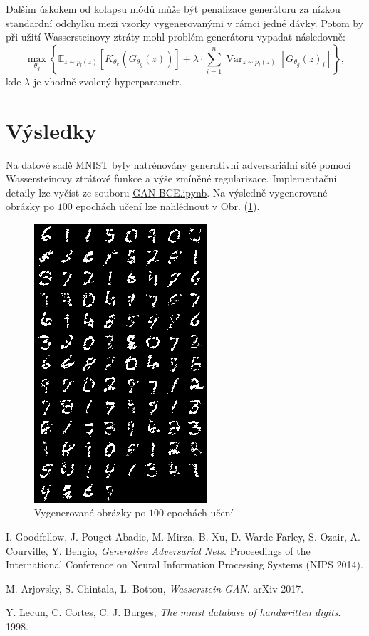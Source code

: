 \documentclass[czech]{article}
\begin{document}
Dalším úskokem od kolapsu módů může být penalizace generátoru za nízkou standardní odchylku mezi vzorky vygenerovanými v rámci jedné dávky.
Potom by při užití Wassersteinovy ztráty mohl problém generátoru vypadat následovně:
\begin{equation}
    \max_{\theta_g} \left\{ \mathbb{E}_{z \sim p_l(z)} \left[K_{\theta_k}\left(G_{\theta_g}(z)\right)\right]
     + \lambda \cdot \sum_{i = 1}^{n} \operatorname{Var}_{z \sim p_l(z)} \left[G_{\theta_g}(z)_i\right]\right\},
\end{equation}
kde $\lambda$ je vhodně zvolený hyperparametr.

\section{Výsledky}

Na datové sadě MNIST \cite{MNIST} byly natrénovány generativní adversariální sítě pomocí Wassersteinovy ztrátové funkce
a výše zmíněné regularizace.
Implementační detaily lze vyčíst ze souboru \href{https://github.com/pavel-jaks/gans/blob/main/code/GAN-BCE.ipynb}{GAN-BCE.ipynb}.
Na výsledně vygenerované obrázky po $100$ epochách učení lze nahlédnout v Obr. (\ref{obr}).

\begin{figure}
    \centering
    \includegraphics{graphics/samples_100.png}
    \caption{Vygenerované obrázky po $100$ epochách učení}
    \label{obr}
\end{figure}

\newpage{}

\begin{thebibliography}{1}

 I. Goodfellow, J. Pouget-Abadie, M. Mirza, B. Xu, D. Warde-Farley, S. Ozair, A. Courville, Y. Bengio,
\emph{Generative Adversarial Nets}.
Proceedings of the International Conference on Neural Information Processing Systems (NIPS 2014).

 M. Arjovsky, S. Chintala, L. Bottou,
\emph{Wasserstein GAN}.
arXiv 2017.

 Y. Lecun, C. Cortes, C. J. Burges,
\emph{The mnist database of handwritten digits}. 1998.

\end{thebibliography}
\end{document}
